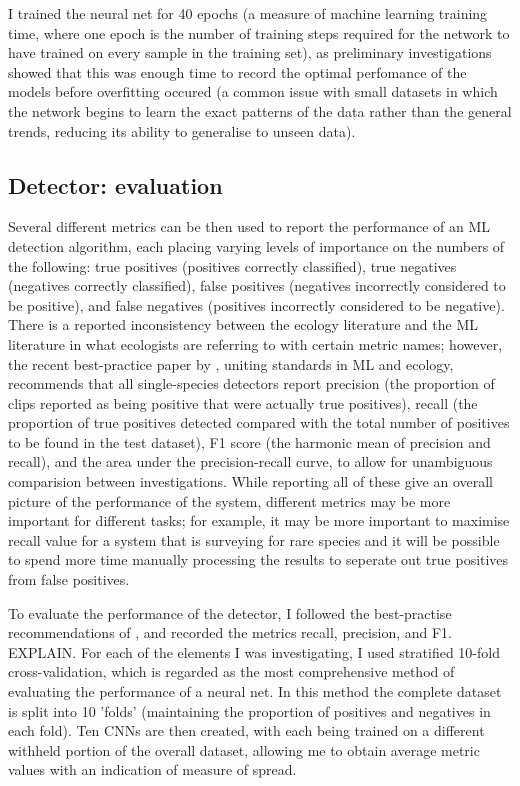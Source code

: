 \documentclass[11pt]{article}
\begin{document}
I trained the neural net for 40 epochs (a measure of machine learning training time, where one epoch is the number of training steps required for the network to have trained on every sample in the training set), as preliminary investigations showed that this was enough time to record the optimal perfomance of the models before overfitting occured (a common issue with small datasets in which the network begins to learn the exact patterns of the data rather than the general trends, reducing its ability to generalise to unseen data).  

\subsection{Detector: evaluation}

Several different metrics can be then used to report the performance of an ML detection algorithm, each placing varying levels of importance on the numbers of the following: true positives (positives correctly classified), true negatives (negatives correctly classified), false positives (negatives incorrectly considered to be positive), and false negatives (positives incorrectly considered to be negative). There is a reported inconsistency between the ecology literature and the ML literature in what ecologists are referring to with certain metric names; however, the recent best-practice paper by \cite{knight2017recommendations}, uniting standards in ML and ecology, recommends that all single-species detectors report precision (the proportion of clips reported as being positive that were actually true positives), recall (the proportion of true positives detected compared with the total number of positives to be found in the test dataset), F1 score (the harmonic mean of precision and recall), and the area under the precision-recall curve, to allow for unambiguous comparision between investigations. While reporting all of these give an overall picture of the performance of the system, different metrics may be more important for different tasks; for example, it may be more important to maximise recall value for a system that is surveying for rare species and it will be possible to spend more time manually processing the results to seperate out true positives from false positives. 

To evaluate the performance of the detector, I followed the best-practise recommendations of \cite{knight2017recommendations}, and recorded the metrics recall, precision, and F1. EXPLAIN. For each of the elements I was investigating, I used stratified 10-fold cross-validation, which is regarded as the most comprehensive method of evaluating the performance of a neural net. In this method the complete dataset is split into 10 'folds' (maintaining the proportion of positives and negatives in each fold). Ten CNNs are then created, with each being trained on a different withheld portion of the overall dataset, allowing me to obtain average metric values with an indication of measure of spread. 
\end{document}
